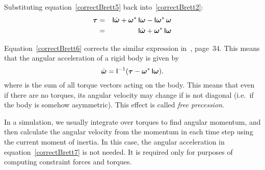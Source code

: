 Substituting equation~\ref{correctBrett5} back into~\ref{correctBrett2}:
\begin{eqnarray}
\ve{\tau} & = & \m{I}\dot{\ve{\omega}} + \dual{\ve{\omega}}\,\m{I}\ve{\omega} -
    \m{I}\dual{\ve{\omega}}\,\ve{\omega} \nonumber \\
& = & \m{I}\dot{\ve{\omega}} + \dual{\ve{\omega}}\,\m{I}\ve{\omega} \label{correctBrett6}
\end{eqnarray}

Equation~\ref{correctBrett6} corrects the similar expression in~\cite{Saunders:PhD},
page~34. This means that the angular acceleration of a rigid body is given by
\begin{equation}
\label{correctBrett7}
\dot{\ve{\omega}} = \m{I}^{-1} (\ve{\tau} - \dual{\ve{\omega}}\,\m{I}\ve{\omega}).
\end{equation}
where \ve{\tau} is the sum of all torque vectors acting on the body. This means that even if
there are no torques, its angular velocity may change if  is not diagonal (i.e.\ if
the body is somehow asymmetric). This effect is called \emph{free precession}.

In a simulation, we usually integrate over torques to find angular momentum, and then calculate
the angular velocity from the momentum in each time step using the current moment of inertia. In
this case, the angular acceleration in equation~\ref{correctBrett7} is not needed. It is required
only for purposes of computing constraint forces and torques.
